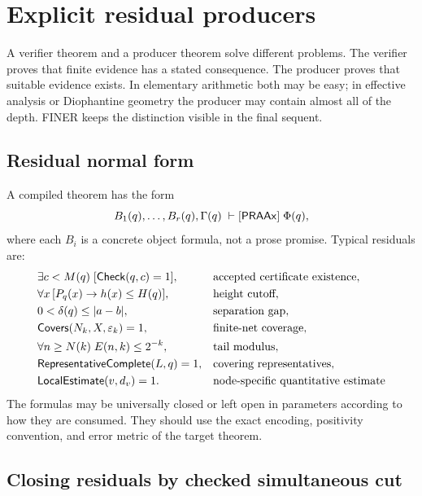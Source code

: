 \section{Explicit residual producers}
\label{sec:residuals}

A verifier theorem and a producer theorem solve different problems.  The verifier proves that finite evidence has a stated consequence.  The producer proves that suitable evidence exists.  In elementary arithmetic both may be easy; in effective analysis or Diophantine geometry the producer may contain almost all of the depth.  FINER keeps the distinction visible in the final sequent.

\subsection{Residual normal form}

A compiled theorem has the form
\begin{equation}
  B_1(q),\ldots,B_r(q),\Gamma(q)
  \;\vdash[\mathsf{PRAAx}]\;\Phi(q),
  \label{eq:residual-normal-form}
\end{equation}
where each \(B_i\) is a concrete object formula, not a prose promise.  Typical residuals are:
\begin{align*}
 &\exists c<M(q)\;[\mathsf{Check}(q,c)=1], &&\text{accepted certificate existence},\\
 &\forall x\,[P_q(x)\to h(x)\leq H(q)], &&\text{height cutoff},\\
 &0<\delta(q)\leq |a-b|, &&\text{separation gap},\\
 &\mathsf{Covers}(N_k,X,\varepsilon_k)=1, &&\text{finite-net coverage},\\
 &\forall n\geq N(k)\;E(n,k)\leq 2^{-k}, &&\text{tail modulus},\\
 &\mathsf{RepresentativeComplete}(L,q)=1, &&\text{covering representatives},\\
 &\mathsf{LocalEstimate}(v,d_v)=1. &&\text{node-specific quantitative estimate}
\end{align*}
The formulas may be universally closed or left open in parameters according to how they are consumed.  They should use the exact encoding, positivity convention, and error metric of the target theorem.

\subsection{Closing residuals by checked simultaneous cut}

